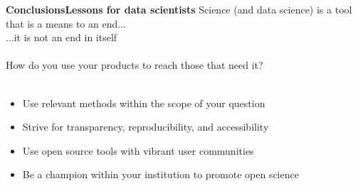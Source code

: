 \documentclass[serif]{beamer}\usepackage[]{graphicx}\usepackage[]{color}
\begin{document}
\begin{frame}{\textbf{Conclusions}}{\textbf{Lessons for data scientists}}
\onslide<+->
Science (and data science) is a tool that is a means to an end... \\
...it is not an end in itself \\~\\
\onslide<+->
How do you use your products to reach those that need it? \\~\\
\onslide<+->
\begin{itemize}
\item Use relevant methods within the scope of your question
\item Strive for transparency, reproducibility, and accessibility
\item Use open source tools with vibrant user communities
\item Be a champion within your institution to promote open science
\end{itemize}
\end{frame}
\end{document}
